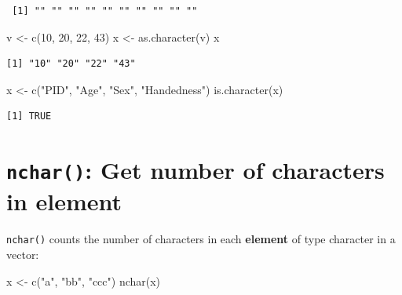 \documentclass[
]{book}
\newenvironment{Shaded}{\begin{snugshade}}{\end{snugshade}}
\newcommand{\DecValTok}[1]{\textcolor[rgb]{0.00,0.00,0.81}{#1}}
\newcommand{\FunctionTok}[1]{\textcolor[rgb]{0.00,0.00,0.00}{#1}}
\newcommand{\NormalTok}[1]{#1}
\newcommand{\OtherTok}[1]{\textcolor[rgb]{0.56,0.35,0.01}{#1}}
\newcommand{\StringTok}[1]{\textcolor[rgb]{0.31,0.60,0.02}{#1}}
\begin{document}
\begin{verbatim}
 [1] "" "" "" "" "" "" "" "" "" ""
\end{verbatim}

\begin{Shaded}
\begin{Highlighting}[]
\NormalTok{v }\OtherTok{\textless{}{-}} \FunctionTok{c}\NormalTok{(}\DecValTok{10}\NormalTok{, }\DecValTok{20}\NormalTok{, }\DecValTok{22}\NormalTok{, }\DecValTok{43}\NormalTok{)}
\NormalTok{x }\OtherTok{\textless{}{-}} \FunctionTok{as.character}\NormalTok{(v)}
\NormalTok{x}
\end{Highlighting}
\end{Shaded}

\begin{verbatim}
[1] "10" "20" "22" "43"
\end{verbatim}

\begin{Shaded}
\begin{Highlighting}[]
\NormalTok{x }\OtherTok{\textless{}{-}} \FunctionTok{c}\NormalTok{(}\StringTok{"PID"}\NormalTok{, }\StringTok{"Age"}\NormalTok{, }\StringTok{"Sex"}\NormalTok{, }\StringTok{"Handedness"}\NormalTok{)}
\FunctionTok{is.character}\NormalTok{(x)}
\end{Highlighting}
\end{Shaded}

\begin{verbatim}
[1] TRUE
\end{verbatim}

\hypertarget{nchar-get-number-of-characters-in-element}{%
\section{\texorpdfstring{\texttt{nchar()}: Get number of characters in element}{nchar(): Get number of characters in element}}\label{nchar-get-number-of-characters-in-element}}

\texttt{nchar()} counts the number of characters in each \textbf{element} of type character in a vector:

\begin{Shaded}
\begin{Highlighting}[]
\NormalTok{x }\OtherTok{\textless{}{-}} \FunctionTok{c}\NormalTok{(}\StringTok{"a"}\NormalTok{, }\StringTok{"bb"}\NormalTok{, }\StringTok{"ccc"}\NormalTok{)}
\FunctionTok{nchar}\NormalTok{(x)}
\end{Highlighting}
\end{Shaded}
\end{document}
